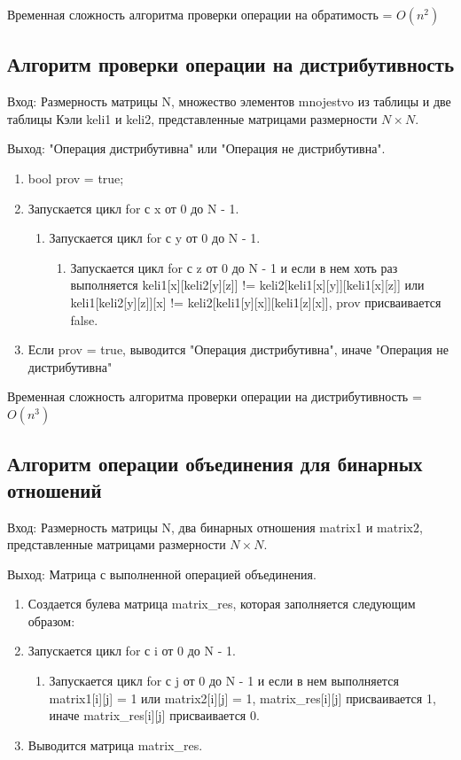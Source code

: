 \documentclass[bachelor, och, labwork]{shiza}
\begin{document}
	Временная сложность алгоритма проверки операции на обратимость = $O(n^2)$	
	
	\subsection{Алгоритм проверки операции на дистрибутивность}	
	
	$\textit{Вход:}$ Размерность матрицы N, множество элементов mnojestvo из таблицы и две таблицы Кэли keli1 и keli2, представленные матрицами размерности $N \times N$.

	$\textit{Выход:}$  "Операция дистрибутивна" или "Операция не дистрибутивна".		
	
	\begin{enumerate} 
		\item bool prov = true;
		\item Запускается цикл for с x от 0 до N - 1.
		\begin{enumerate} 
			\item Запускается цикл for с y от 0 до N - 1.
			\begin{enumerate} 
				\item Запускается цикл for с z от 0 до N - 1 и если в нем хоть раз выполняется keli1[x][keli2[y][z]] !=
				keli2[keli1[x][y]][keli1[x][z]] или
				keli1[keli2[y][z]][x] !=
				keli2[keli1[y][x]][keli1[z][x]], prov присваивается false.
			\end{enumerate} 
		\end{enumerate}
		\item Если prov = true, выводится "Операция дистрибутивна", иначе "Операция не дистрибутивна"
	\end{enumerate} 
	
	Временная сложность алгоритма проверки операции на дистрибутивность = $O(n^3)$
	
	\subsection{Алгоритм операции объединения для бинарных отношений}	
	
		$\textit{Вход:}$ Размерность матрицы N, два бинарных отношения matrix1 и matrix2, представленные матрицами размерности $N \times N$.
	
		$\textit{Выход:}$  Матрица с выполненной операцией объединения.
	
	\begin{enumerate} 
		\item Создается булева матрица matrix\_res, которая заполняется следующим образом:
		\item Запускается цикл for с i от 0 до N - 1.
		\begin{enumerate} 
			\item Запускается цикл for с j от 0 до N - 1 и если в нем выполняется matrix1[i][j] = 1 или
			matrix2[i][j] = 1, matrix\_res[i][j] присваивается 1, иначе matrix\_res[i][j] присваивается 0.
		\end{enumerate}
		\item Выводится матрица matrix\_res.
	\end{enumerate} 
	
\end{document}
